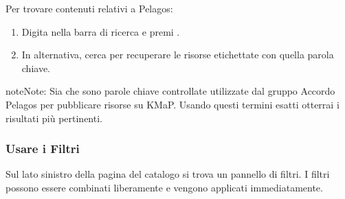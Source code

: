 \documentclass[letterpaper,10pt,english]{sphinxmanual}
\begin{document}
\sphinxAtStartPar
Per trovare contenuti relativi a Pelagos:
\begin{enumerate}
%
\item {} 
\sphinxAtStartPar
Digita  nella barra di ricerca e premi .

\item {} 
\sphinxAtStartPar
In alternativa, cerca  per recuperare le risorse etichettate
con quella parola chiave.

\end{enumerate}

\begin{sphinxadmonition}{note}{Note:}
\sphinxAtStartPar
Sia  che  sono parole chiave controllate
utilizzate dal gruppo Accordo Pelagos per pubblicare risorse su KMaP. Usando questi
termini esatti otterrai i risultati più pertinenti.
\end{sphinxadmonition}


\subsubsection{Usare i Filtri}
\label{\detokenize{it/02_trovare_visualizzare:usare-i-filtri}}
\sphinxAtStartPar
Sul lato sinistro della pagina del catalogo si trova un pannello di filtri. I filtri
possono essere combinati liberamente e vengono applicati immediatamente.
\end{document}
